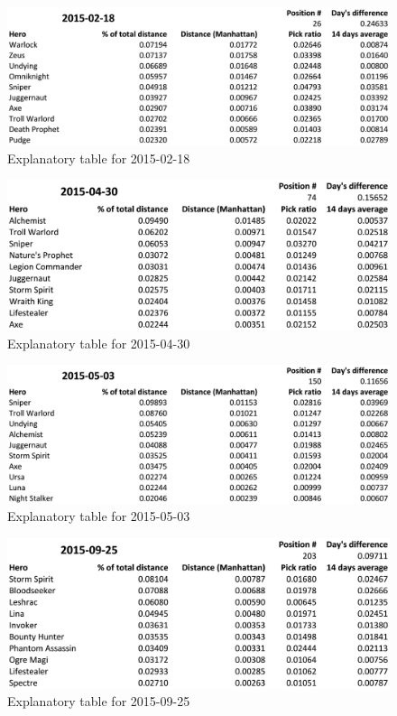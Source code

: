 \begin{figure}[H]
    \centering
    \caption{Explanatory table for 2015-02-18}
    \label{fig:20150218}
    \includegraphics[width=1\textwidth]{20150218.png}
\end{figure}

\begin{figure}[H]
    \centering
    \caption{Explanatory table for 2015-04-30}
    \label{fig:20150430}
    \includegraphics[width=1\textwidth]{20150430.png}
\end{figure}

\begin{figure}[H]
    \centering
    \caption{Explanatory table for 2015-05-03}
    \label{fig:20150503}
    \includegraphics[width=1\textwidth]{20150503.png}
\end{figure}

\begin{figure}[H]
    \centering
    \caption{Explanatory table for 2015-09-25}
    \label{fig:20150925}
    \includegraphics[width=1\textwidth]{20150925.png}
\end{figure}

